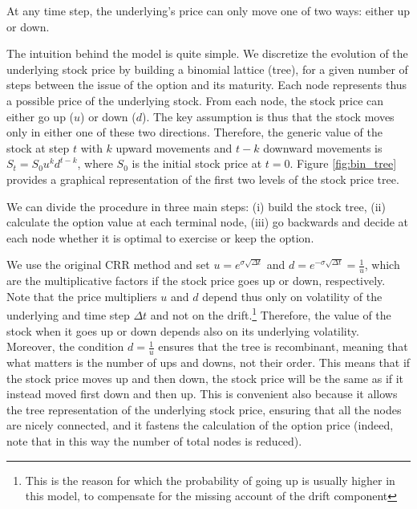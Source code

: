 \begin{assumption}
    \label{ass:bin_9}
    At any time step, the underlying's price can only move one of two ways: either up or down.
\end{assumption}

The intuition behind the model is quite simple. We discretize the evolution of the underlying stock price by building a binomial lattice (tree), for a given number of steps between the issue of the option and its maturity. Each node represents thus a possible price of the underlying stock. From each node, the stock price can either go up ($u$) or down ($d$). The key assumption is thus that the stock moves only in either one of these two directions. Therefore, the generic value of the stock at step $t$ with $k$ upward movements and $t-k$ downward movements is $S_t = S_0 u^k d^{t-k}$, where $S_0$ is the initial stock price at $t=0$. Figure \ref*{fig:bin_tree} provides a graphical representation of the first two levels of the stock price tree. 


We can divide the procedure in three main steps: (i) build the stock tree, (ii) calculate the option value at each terminal node, (iii) go backwards and decide at each node whether it is optimal to exercise or keep the option.

We use the original CRR method and set $u = e^{\sigma \sqrt{\Delta t}}$ and $d = e^{-\sigma \sqrt{\Delta t}}=\frac{1}{u}$, which are the multiplicative factors if the stock price goes up or down, respectively. Note that the price multipliers $u$ and $d$ depend thus only on volatility of the underlying and time step $\Delta t$ and not on the drift.\footnote{This is the reason for which the probability of going up is usually higher in this model, to compensate for the missing account of the drift component} Therefore, the value of the stock when it goes up or down depends also on its underlying volatility. Moreover, the condition $d = \frac{1}{u}$ ensures that the tree is recombinant, meaning that what matters is the number of ups and downs, not their order. This means that if the stock price moves up and then down, the stock price will be the same as if it instead moved first down and then up. This is convenient also because it allows the tree representation of the underlying stock price, ensuring that all the nodes are nicely connected, and it fastens the calculation of the option price (indeed, note that in this way the number of total nodes is reduced). 

